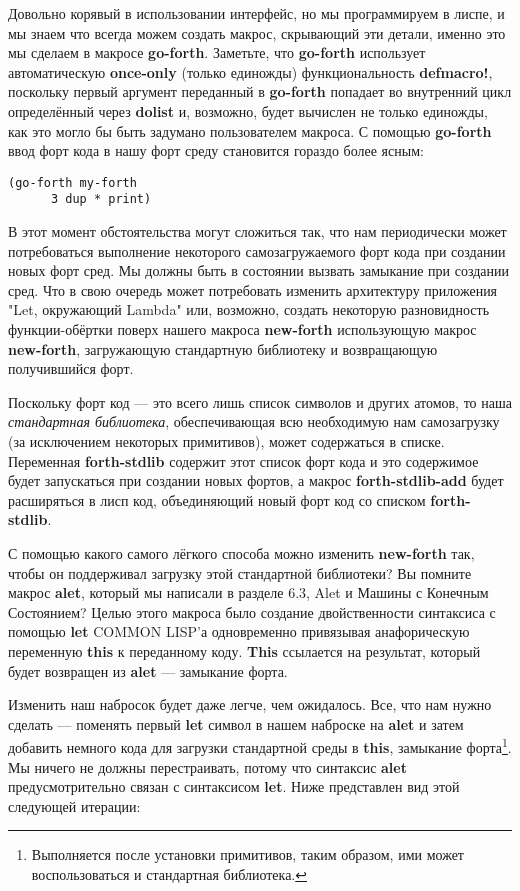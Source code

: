 Довольно корявый в использовании интерфейс, но мы программируем в лиспе, и мы знаем что всегда можем создать макрос, скрывающий эти детали, именно это мы сделаем в макросе \textbf{go-forth}. Заметьте, что \textbf{go-forth} использует автоматическую \textbf{once-only} (только единожды) функциональность \textbf{defmacro!}, поскольку первый аргумент переданный в \textbf{go-forth} попадает во внутренний цикл определённый через \textbf{dolist} и, возможно, будет вычислен не только единожды, как это могло бы быть задумано пользователем макроса. С помощью \textbf{go-forth} ввод форт кода в нашу форт среду становится гораздо более ясным:

\begin{verbatim}
(go-forth my-forth
	  3 dup * print)
\end{verbatim}

В этот момент обстоятельства могут сложиться так, что нам периодически может потребоваться выполнение некоторого самозагружаемого форт кода при создании новых форт сред. Мы должны быть в состоянии вызвать замыкание при создании сред. Что в свою очередь может потребовать изменить архитектуру приложения "Let, окружающий Lambda" или, возможно, создать некоторую разновидность функ\-ции-обёрт\-ки поверх нашего макроса \textbf{new-forth} использующую макрос \textbf{new-forth}, загружающую стандартную библиотеку и возвращающую получившийся форт.

Поскольку форт код --- это всего лишь список символов и других атомов, то наша \emph{стандартная библиотека}, обеспечивающая всю необходимую нам самозагрузку (за исключением некоторых примитивов), может содержаться в списке. Переменная \textbf{forth-stdlib} содержит этот список форт кода и это содержимое будет запускаться при создании новых фортов, а макрос \textbf{forth-stdlib-add} будет расширяться в лисп код, объединяющий новый форт код со списком \textbf{forth-stdlib}.

С помощью какого самого лёгкого способа можно изменить \textbf{new-forth} так, чтобы он поддерживал загрузку этой стандартной библиотеки? Вы помните макрос \textbf{alet}, который мы написали в разделе 6.3, Alet и Машины с Конечным Состоянием? Целью этого макроса было создание двойственности синтаксиса с помощью \textbf{let} COMMON LISP'а одновременно привязывая анафорическую переменную \textbf{this} к переданному коду. \textbf{This} ссылается на результат, который будет возвращен из \textbf{alet} --- замыкание форта.

Изменить наш набросок будет даже легче, чем ожидалось. Все, что нам нужно сделать --- поменять первый \textbf{let} символ в нашем наброске на \textbf{alet} и затем добавить немного кода для загрузки стандартной среды в \textbf{this}, замыкание форта\footnote{Выполняется после установки примитивов, таким образом, ими может воспользоваться и стандартная библиотека.}. Мы ничего не должны перестраивать, потому что синтаксис \textbf{alet} предусмотрительно связан с синтаксисом \textbf{let}. Ниже представлен вид этой следующей итерации:

